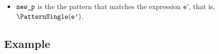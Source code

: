 \documentclass{book}
\newcommand\TypeErrorConfig[0]{\hyperlink{def-typeerrorconfig}{\texttt{\#TE}}}
\newcommand\ProseOrTypeError[0]{\hyperlink{def-proseortypeerror}{$^{\TypeErrorConfig}$}}
\newcommand\vt[0]{\texttt{t}}
\newcommand\vte[0]{\texttt{t\_e}}
\newcommand\vep[0]{\texttt{e'}}
\begin{document}
\begin{itemize}
\begin{itemize}
    \item All of the following apply (\textsc{error}):
    \begin{itemize}
      \item determining whether the labels of $\vtstruct$ and $\testruct$ are the same yields $\True$ \ProseOrTypeError;
      \item the label of $\vtstruct$ is not one of $\TBool$, $\TReal$, $\TInt$, $\TBits$, or $\TEnum$;
      \item the result is a type error indicating that the types $\vt$ and $\vte$ are inappropriate for this pattern.
    \end{itemize}
  \end{itemize}
  \item $\texttt{new\_p}$ is the the pattern that matches the expression $\vep$, that is, $\PatternSingle(\vep)$.
\end{itemize}

\subsection{Example}

\end{document}
